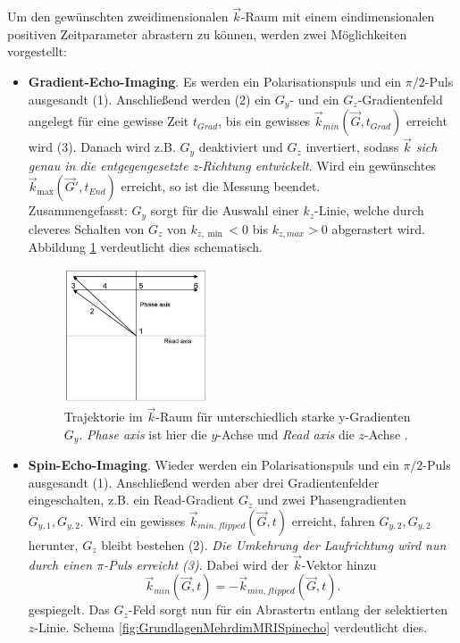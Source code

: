 \documentclass[../main.tex]{subfiles}
\begin{document}
    Um den gewünschten zweidimensionalen $\vec{k}$-Raum mit einem eindimensionalen positiven Zeitparameter abrastern zu können, werden zwei Möglichkeiten vorgestellt:
    \begin{itemize}
        \item \textbf{Gradient-Echo-Imaging}. Es werden ein Polarisationspuls und ein $\pi/2$-Puls ausgesandt (1). Anschließend werden (2) ein $G_y$- und ein $G_z$-Gradientenfeld angelegt für eine gewisse Zeit $t_{Grad}$, bis ein gewisses $\vec{k}_{min}(\vec{G}, t_{Grad})$ erreicht wird (3). Danach wird z.B. $G_y$ deaktiviert und $G_z$ invertiert, sodass \textit{$\vec{k}$ sich genau in die entgegengesetzte z-Richtung entwickelt}. Wird ein gewünschtes $\vec{k}_{\max}(\vec{G}', t_{End})$ erreicht, so ist die Messung beendet.\\

        Zusammengefasst: $G_y$ sorgt für die Auswahl einer $k_z$-Linie, welche durch cleveres Schalten von $G_z$ von $k_{z,\min}<0$ bis $k_{z,max}>0$ abgerastert wird. Abbildung \ref{fig:GrundlagenMehrdimMRIGradientecho} verdeutlicht dies schematisch.

        \begin{figure}[H]
            \centering
            \includegraphics[width=0.4\textwidth]{Bilddateien/GrundlagenMehrdimMRIGradientecho.jpg}
            \caption{Trajektorie im $\vec{k}$-Raum für unterschiedlich starke y-Gradienten $G_y$. \textit{Phase axis} ist hier die $y$-Achse und \textit{Read axis} die $z$-Achse \cite[p.74]{doc:EFNMRStudentManual}.}
            \label{fig:GrundlagenMehrdimMRIGradientecho}
        \end{figure}
        
        \item \textbf{Spin-Echo-Imaging}. Wieder werden ein Polarisationspuls und ein $\pi/2$-Puls ausgesandt (1). Anschließend werden aber drei Gradientenfelder eingeschalten, z.B. ein Read-Gradient $G_z$ und zwei Phasengradienten $G_{y,1}, G_{y,2}$. Wird ein gewisses $\vec{k}_{min, flipped}(\vec{G}, t)$ erreicht, fahren $G_{y,2}, G_{y,2}$ herunter, $G_z$ bleibt bestehen (2). \textit{Die Umkehrung der Laufrichtung wird nun durch einen $\pi$-Puls erreicht (3)}. Dabei wird der $\vec k$-Vektor hinzu 
        \[
        \vec{k}_{min}(\vec{G}, t) = -\vec{k}_{min, flipped}(\vec{G}, t).
        \]
        gespiegelt. Das $G_z$-Feld sorgt nun für ein Abrastertn entlang der selektierten $z$-Linie. Schema \ref{fig:GrundlagenMehrdimMRISpinecho} verdeutlicht dies.


\end{itemize}
\end{document}
